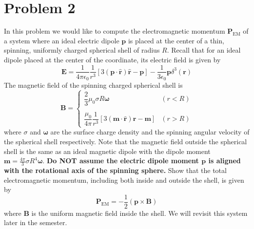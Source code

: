 \documentclass[10pt]{article}
\begin{document}
	\section*{Problem 2}
	In this problem we would like to compute the electromagnetic momentum \( \mathbf{P}_\text{EM} \) of a
	system where an ideal electric dipole \( \mathbf{p} \) is placed at the center of a thin, spinning,
	uniformly charged spherical shell of radius \( R \). Recall that for an ideal dipole placed at the center
	of the coordinate, its electric field is given by 
	\[
		\mathbf{E} = \frac{1}{4 \pi \epsilon_0}\frac{1}{r^3}[3(\mathbf{p} \cdot \hat{\mathbf{r}})
		\hat{\mathbf{r}} - \mathbf{p}] - \frac{1}{3\epsilon_0}\mathbf{p} \delta^3(\mathbf{r})
	\]
	The magnetic field of the spinning charged spherical shell is
	\[
		\mathbf{B} = \begin{cases}
			\dfrac{2}{3}\mu_0 \sigma R \boldsymbol{\omega}& (r < R)\\
			\\
			\dfrac{\mu_0}{4\pi}\dfrac{1}{r^3}[3 (\mathbf{m} \cdot \hat{\mathbf{r}})\mathbf{r} - \mathbf{m}] &
			(r > R)
		\end{cases}
	\]
	where \( \sigma \) and \( \boldsymbol{\omega} \) are the surface charge density and the spinning angular
	velocity of the spherical shell respectively. Note that the magnetic field outside the spherical shell is
	the same as an ideal magnetic dipole with the dipole moment \( \mathbf{m} = \frac{4\pi}{3}\sigma R^{4}
	\boldsymbol{\omega} \). {\color{red} \textbf{Do NOT assume the electric dipole moment \( \mathbf{p} \) is
	aligned with the rotational axis of the spinning sphere.}} Show that the total electromagnetic momentum,
	including both inside and outside the shell, is given by
	\[
		\mathbf{P}_\text{EM} = -\frac{1}{2}(\mathbf{p} \times \mathbf{B})
	\]
	where \( \mathbf{B} \) is the uniform magnetic field inside the shell. We will revisit this system later
	in the semester. 
\end{document}
